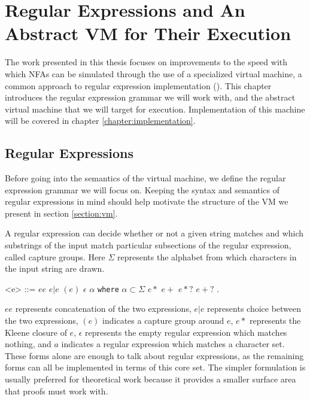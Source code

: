\chapter{Regular Expressions and An Abstract VM for Their Execution}
\label{chapter:abstractvm}

The work presented in this thesis focuses on improvements to the
speed with which NFAs can be simulated through the use of a
specialized virtual machine, a common approach to regular
expression implementation (\cite{CoxVirtualMachineApproach}).
This chapter introduces the regular expression grammar we will
work with, and the abstract virtual machine that we will target for
execution. Implementation of this machine will be covered in chapter
\ref{chapter:implementation}.

\section{Regular Expressions}
\label{section:regexdef}

Before going into the semantics of the virtual machine, we
define the regular expression grammar we will focus on.
Keeping the syntax and semantics of regular expressions in
mind should help motivate the structure of the VM we present
in section \ref{section:vm}.

A regular expression can decide whether or not a given string
matches and which substrings of the input match particular
subsections of the regular expression, called capture groups.
Here $\Sigma$ represents the alphabet from which characters in
the input string are drawn.

\begin{grammar}
  <e> ::= $e e$
  \alt $e \rvert e$
  \alt $(e)$
  \alt $\epsilon$
  \alt $\alpha$ {\tt where} $\alpha \subset \Sigma$
  \alt $e*$
  \alt $e+$
  \alt $e*?$
  \alt $e+?$
  \alt $.$
\end{grammar}

$e e$ represents concatenation of the two expressions,
$e|e$ represents choice between the two expressions, $(e)$ indicates a
capture group around $e$, $e*$ represents the Kleene closure of $e$,
$\epsilon$ represents the empty regular expression which matches nothing,
and $a$ indicates a regular expression which matches a character set.
These forms alone are enough to talk about regular expressions, as
the remaining forms can all be implemented in terms of this core set.
The simpler formulation is usually preferred for theoretical work because
it provides a smaller surface area that proofs must work with. 

